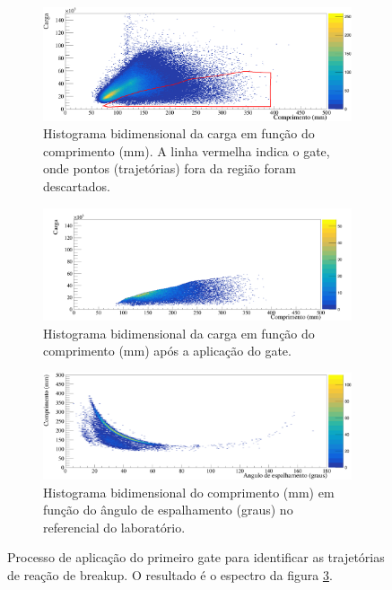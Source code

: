 \documentclass[a4paper,12pt,oneside]{book}
\begin{document}
\begin{figure}[H]
\centering
    \begin{subfigure}[b]{\textwidth}
        \centering
        \includegraphics[scale = 0.5, width=\columnwidth]{figs/carga_vs_comp_n2.png}
        \caption{Histograma bidimensional da carga em função do comprimento (mm). A linha vermelha indica o gate, onde pontos (trajetórias) fora da região foram descartados.}
        \label{subfig:carga_comp_cut1}
    \end{subfigure}%
    \hfill
    \begin{subfigure}[b]{\textwidth}
        \centering
        \includegraphics[scale=0.5, width=\columnwidth]{figs/carga_vs_comp_n2_cut1.png}
        \caption{Histograma bidimensional da carga em função do comprimento (mm) após a aplicação do gate.}
        \label{subfig:carga_comp_nocut}
    \end{subfigure}%
	\hfill
    \begin{subfigure}[b]{\textwidth}
        \centering
        \includegraphics[scale=0.5, width=\columnwidth]{figs/comp_vs_ang_n2_cut1.png}
        \caption{Histograma bidimensional do comprimento (mm) em função do ângulo de espalhamento (graus) no referencial do laboratório.}
        \label{subfig:comp_vs_carga_cut1}
    \end{subfigure}%
    \hfill
\caption{Processo de aplicação do primeiro gate para identificar as trajetórias de reação de breakup. O resultado é o espectro da figura \ref{subfig:comp_vs_carga_cut1}.}
\label{fig:gate_1}
\end{figure}
\end{document}
